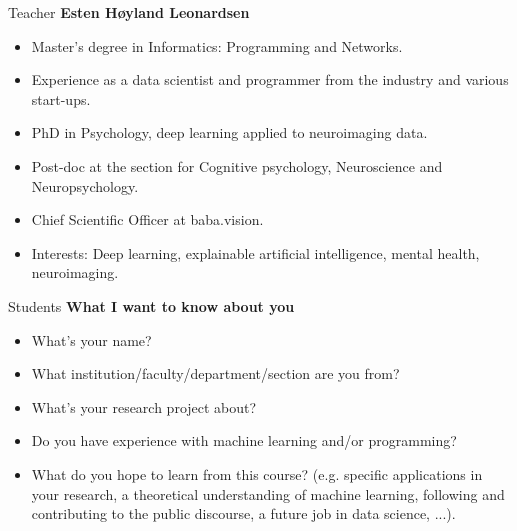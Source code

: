 \begin{frame}{Teacher}
    \textbf{Esten Høyland Leonardsen}
    \begin{itemize}
        \item Master's degree in Informatics: Programming and Networks.
        \item Experience as a data scientist and programmer from the industry and various start-ups.
        \item PhD in Psychology, deep learning applied to neuroimaging data.
        \item Post-doc at the section for Cognitive psychology, Neuroscience and Neuropsychology.
        \item Chief Scientific Officer at baba.vision.
        \item Interests: Deep learning, explainable artificial intelligence, mental health, neuroimaging.
    \end{itemize}
\end{frame}

\begin{frame}{Students}
    \textbf{What I want to know about you}
    \begin{itemize}
        \item What's your name?
        \item What institution/faculty/department/section are you from?
        \item What's your research project about?
        \item Do you have experience with machine learning and/or programming?
        \item What do you hope to learn from this course? (e.g. specific applications in your research, a theoretical understanding of machine learning, following and contributing to the public discourse, a future job in data science, ...).
    \end{itemize}
\end{frame}

